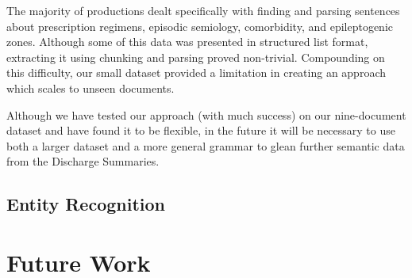 \documentclass{acm_proc_article-sp}
\begin{document}
The majority of productions dealt specifically with finding and parsing
sentences about prescription regimens, episodic semiology, comorbidity, and epileptogenic
zones. Although some of this data was presented in structured list format, extracting it using
chunking and parsing proved non-trivial. Compounding on this difficulty, our 
small dataset provided a limitation in creating an approach which scales to unseen documents.

Although we have tested our approach (with much success) on our nine-document dataset and have found it
to be flexible, in the future it will be necessary
to use both a larger dataset and a more general grammar to glean further semantic
data from the Discharge Summaries.
\subsection{Entity Recognition}
\section{Future Work}
{}

\end{document}
